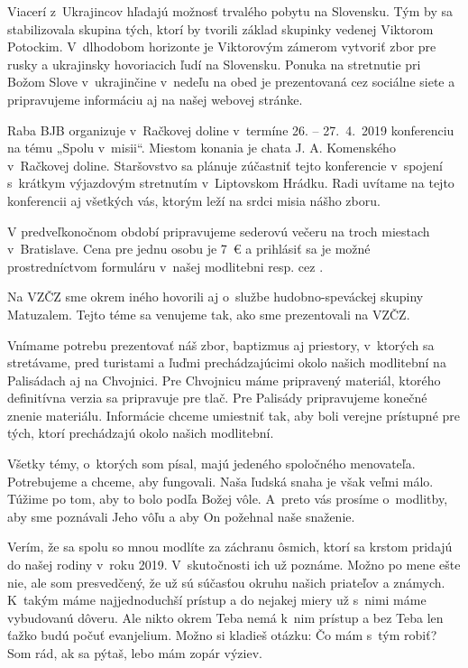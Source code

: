 Viacerí z~Ukrajincov hľadajú možnosť trvalého pobytu na Slovensku.  Tým by sa stabilizovala skupina tých, ktorí by tvorili základ skupinky vedenej Viktorom Potockim. V~dlhodobom horizonte je Viktorovým zámerom vytvoriť zbor pre rusky a ukrajinsky hovoriacich ľudí na Slovensku. Ponuka na stretnutie pri Božom Slove v~ukrajinčine v~nedeľu na obed je prezentovaná cez sociálne siete a pripravujeme informáciu aj na našej webovej stránke.

Raba BJB organizuje v~Račkovej doline v~termíne 26. -- 27.~4.~2019 konferenciu na tému „Spolu v~misii“. Miestom konania je chata J. A. Komenského v~Račkovej doline. Staršovstvo sa plánuje zúčastniť tejto konferencie v~spojení s~krátkym výjazdovým stretnutím v~Liptovskom Hrádku. Radi uvítame na tejto konferencii aj všetkých vás, ktorým leží na srdci misia nášho zboru.

V predveľkonočnom období pripravujeme sederovú večeru na troch miestach v~Bratislave. Cena pre jednu osobu je 7~€ a prihlásiť sa je možné prostredníctvom formuláru v~našej modlitebni resp. cez .

Na VZČZ sme okrem iného hovorili aj o~službe hudobno-speváckej skupiny Matuzalem. Tejto téme sa venujeme tak, ako sme prezentovali na VZČZ.

Vnímame potrebu prezentovať náš zbor, baptizmus aj priestory, v~ktorých sa stretávame, pred turistami a ľuďmi prechádzajúcimi okolo našich modlitební na Palisádach aj na Chvojnici. Pre Chvojnicu máme pripravený materiál, ktorého definitívna verzia sa pripravuje pre tlač. Pre Palisády pripravujeme konečné znenie materiálu. Informácie chceme umiestniť tak, aby boli verejne prístupné pre tých, ktorí prechádzajú okolo našich modlitební.

Všetky témy, o~ktorých som písal, majú jedeného spoločného menovateľa. Potrebujeme a chceme, aby fungovali. Naša ľudská snaha je však veľmi málo. Túžime po tom, aby to bolo podľa Božej vôle. A~preto vás prosíme o~modlitby, aby sme poznávali Jeho vôľu a aby On požehnal naše snaženie.



Verím, že sa spolu so mnou modlíte za záchranu ôsmich, ktorí sa krstom pridajú do našej rodiny v~roku 2019. V~skutočnosti ich už poznáme. Možno po mene ešte nie, ale som presvedčený, že už sú súčasťou okruhu našich priateľov a známych. K~takým máme najjednoduchší prístup a do nejakej miery už s~nimi máme vybudovanú dôveru. Ale nikto okrem Teba nemá k~nim prístup a bez Teba len ťažko budú počuť evanjelium. Možno si kladieš otázku: Čo mám s~tým robiť? Som rád, ak sa pýtaš, lebo mám zopár výziev.

